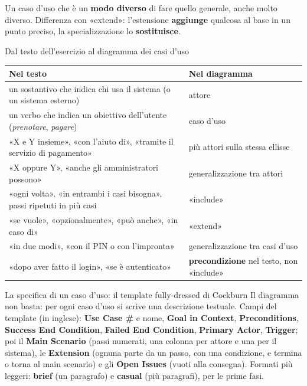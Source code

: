   {}
  {Un caso d'uso che è un \textbf{modo diverso} di fare quello generale, anche molto diverso. Differenza con
   «extend»: l'estensione \textbf{aggiunge} qualcosa al base in un punto preciso, la specializzazione lo
   \textbf{sostituisce}.}

\begin{guida}{Dal testo dell'esercizio al diagramma dei casi d'uso}
\centering
\renewcommand{\arraystretch}{1.3}
\begin{tabular}{@{}l l@{}}
  \textbf{Nel testo} & \textbf{Nel diagramma} \\ \hline
  un sostantivo che indica chi usa il sistema (o un sistema esterno) & attore \\
  un verbo che indica un obiettivo dell'utente (\textit{prenotare}, \textit{pagare}) & caso d'uso \\
  «X e Y insieme», «con l'aiuto di», «tramite il servizio di pagamento» & più attori sulla stessa ellisse \\
  «X oppure Y», «anche gli amministratori possono» & generalizzazione tra attori \\
  «ogni volta», «in entrambi i casi bisogna», passi ripetuti in più casi & «include» \\
  «se vuole», «opzionalmente», «può anche», «in caso di» & «extend» \\
  «in due modi», «con il PIN o con l'impronta» & generalizzazione tra casi d'uso \\
  «dopo aver fatto il login», «se è autenticato» & \textbf{precondizione} nel testo, non «include» \\
\end{tabular}
\end{guida}

\begin{guida}{La specifica di un caso d'uso: il template fully-dressed di Cockburn}
Il diagramma non basta: per ogni caso d'uso si scrive una descrizione testuale. Campi del template (in inglese):
\textbf{Use Case \#} e nome, \textbf{Goal in Context}, \textbf{Preconditions}, \textbf{Success End Condition},
\textbf{Failed End Condition}, \textbf{Primary Actor}, \textbf{Trigger}; poi il \textbf{Main Scenario} (passi numerati,
una colonna per attore e una per il sistema), le \textbf{Extension} (ognuna parte da un passo, con una condizione, e
termina o torna al main scenario) e gli \textbf{Open Issues} (vuoti alla consegna). Formati più leggeri: \textbf{brief}
(un paragrafo) e \textbf{casual} (più paragrafi), per le prime fasi.
\end{guida}

